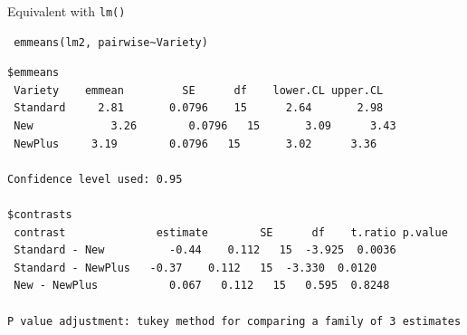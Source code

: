 \documentclass{beamer}
\makeatletter
\newenvironment{kframe}{%
 \def\at@end@of@kframe{}%
 \ifinner\ifhmode%
  \def\at@end@of@kframe{\end{minipage}}%
  \begin{minipage}{\columnwidth}%
 \fi\fi%
 \def\FrameCommand##1{\hskip\@totalleftmargin \hskip-\fboxsep
 \colorbox{shadecolor}{##1}\hskip-\fboxsep
     \hskip-\linewidth \hskip-\@totalleftmargin \hskip\columnwidth}%
 \MakeFramed {\advance\hsize-\width
   \@totalleftmargin\z@ \linewidth\hsize
   \@setminipage}}%
 {\par\unskip\endMakeFramed%
 \at@end@of@kframe}
\newenvironment{knitrout}{}{} %
\makeatother
\begin{document}
\begin{frame}[fragile]{Equivalent with \texttt{lm()}}
    \begin{knitrout}
\color{fgcolor}\begin{kframe}
\footnotesize
\begin{verbatim}
 emmeans(lm2, pairwise~Variety)
\end{verbatim}
\end{kframe}
\end{knitrout}
 
   \begin{knitrout}
\color{fgcolor}\begin{kframe}
\footnotesize
\begin{verbatim}
$emmeans
 Variety    emmean         SE      df    lower.CL upper.CL
 Standard     2.81       0.0796    15      2.64       2.98
 New            3.26        0.0796   15       3.09      3.43
 NewPlus     3.19        0.0796   15       3.02      3.36
 
Confidence level used: 0.95 
 
$contrasts
 contrast              estimate        SE      df    t.ratio p.value
 Standard - New          -0.44    0.112   15  -3.925  0.0036
 Standard - NewPlus   -0.37    0.112   15  -3.330  0.0120
 New - NewPlus           0.067   0.112   15   0.595  0.8248
 
P value adjustment: tukey method for comparing a family of 3 estimates 
             
\end{verbatim}
\end{kframe}
\end{knitrout}

\end{frame}
\end{document}
